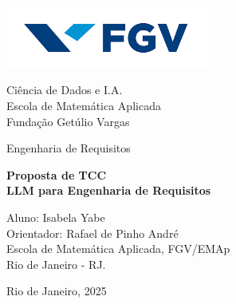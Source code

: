 \documentclass[12pt,a4paper]{article}
\begin{document}
\begin{titlepage}
    \begin{center}
        \vspace*{0cm}
        
            \includegraphics[width=0.5\textwidth]{Images/Logo_FGV.png} 
            
        \vspace{1.5cm}
        \large
        
        Ciência de Dados e I.A.\\
        Escola de Matemática Aplicada\\
        Fundação Getúlio Vargas\\

        \vspace{1cm}  
    
        \Large
        Engenharia de Requisitos
            
        \vspace{2cm}
        
        \vspace{0.25cm}

        \Huge \textbf{Proposta de TCC} \\ 
        \vspace{0.5cm}
        \huge \textbf{LLM para Engenharia de Requisitos}
        \vspace{3.6cm}
        
        \large
                Aluno: Isabela Yabe\\
                Orientador: Rafael de Pinho André\\
                Escola de Matemática Aplicada, FGV/EMAp \\
                Rio de Janeiro - RJ.
        \vfill
            
        \vspace{0.8cm}  
        
        Rio de Janeiro, 2025
            
    \end{center}
\end{titlepage}

\newpage
\tableofcontents

\newpage
\end{document}

